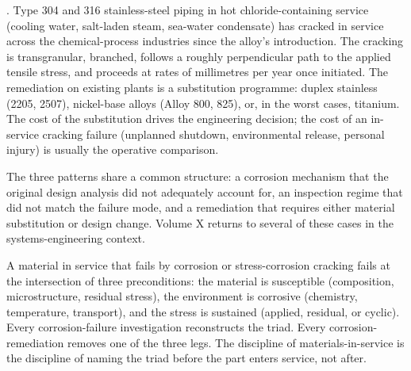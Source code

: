 . Type
304 and 316 stainless-steel piping in hot chloride-containing service
(cooling water, salt-laden steam, sea-water condensate) has cracked
in service across the chemical-process industries since the alloy's
introduction. The cracking is transgranular, branched, follows a
roughly perpendicular path to the applied tensile stress, and
proceeds at rates of millimetres per year once initiated. The
remediation on existing plants is a substitution programme:
duplex stainless (2205, 2507), nickel-base alloys (Alloy 800, 825),
or, in the worst cases, titanium. The cost of the substitution drives
the engineering decision; the cost of an in-service cracking failure
(unplanned shutdown, environmental release, personal injury) is
usually the operative comparison.

The three patterns share a common structure: a corrosion mechanism
that the original design analysis did not adequately account for, an
inspection regime that did not match the failure mode, and a remediation
that requires either material substitution or design change. Volume X
returns to several of these cases in the systems-engineering context.

\begin{principle}
A material in service that fails by corrosion or stress-corrosion
cracking fails at the intersection of three preconditions: the
material is susceptible (composition, microstructure, residual stress),
the environment is corrosive (chemistry, temperature, transport), and
the stress is sustained (applied, residual, or cyclic). Every
corrosion-failure investigation reconstructs the triad. Every
corrosion-remediation removes one of the three legs. The discipline of
materials-in-service is the discipline of naming the triad before the
part enters service, not after.
\end{principle}

